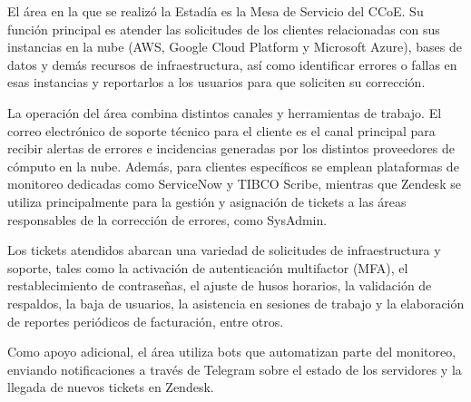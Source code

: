 El área en la que se realizó la Estadía es la Mesa de Servicio del CCoE. Su función principal es atender las solicitudes de los clientes relacionadas con sus instancias en la nube (AWS, Google Cloud Platform y Microsoft Azure), bases de datos y demás recursos de infraestructura, así como identificar errores o fallas en esas instancias y reportarlos a los usuarios para que soliciten su corrección.

La operación del área combina distintos canales y herramientas de trabajo. El correo electrónico de soporte técnico para el cliente es el canal principal para recibir alertas de errores e incidencias generadas por los distintos proveedores de cómputo en la nube. Además, para clientes específicos se emplean plataformas de monitoreo dedicadas como ServiceNow y TIBCO Scribe, mientras que Zendesk se utiliza principalmente para la gestión y asignación de tickets a las áreas responsables de la corrección de errores, como SysAdmin.

Los tickets atendidos abarcan una variedad de solicitudes de infraestructura y soporte, tales como la activación de autenticación multifactor (MFA), el restablecimiento de contraseñas, el ajuste de husos horarios, la validación de respaldos, la baja de usuarios, la asistencia en sesiones de trabajo y la elaboración de reportes periódicos de facturación, entre otros.

Como apoyo adicional, el área utiliza bots que automatizan parte del monitoreo, enviando notificaciones a través de Telegram sobre el estado de los servidores y la llegada de nuevos tickets en Zendesk.
